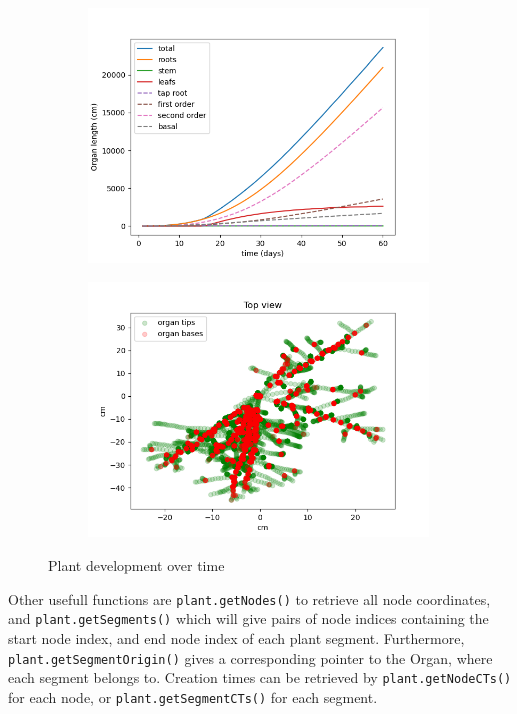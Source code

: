 \begin{figure}
\begin{subfigure}[c]{0.5\textwidth}
\includegraphics[width=0.99\textwidth]{examples/results/topics_development.png}
 \label{fig:topics_development}
\end{subfigure}
\begin{subfigure}[c]{0.5\textwidth}
\includegraphics[width=0.99\textwidth]{examples/results/topics_development2.png}
 \label{fig:topics_development2}
\end{subfigure}
\caption{Plant development over time} 
\end{figure}

Other usefull functions are \texttt{plant.getNodes()} to retrieve all node coordinates, and \texttt{plant.getSegments()} which will give pairs of node indices containing the start node index, and end node index of each plant segment. Furthermore, \texttt{plant.getSegmentOrigin()} gives a corresponding pointer to the Organ, where each segment belongs to. Creation times can be retrieved by \texttt{plant.getNodeCTs()} for each node, or \texttt{plant.getSegmentCTs()} for each segment.
